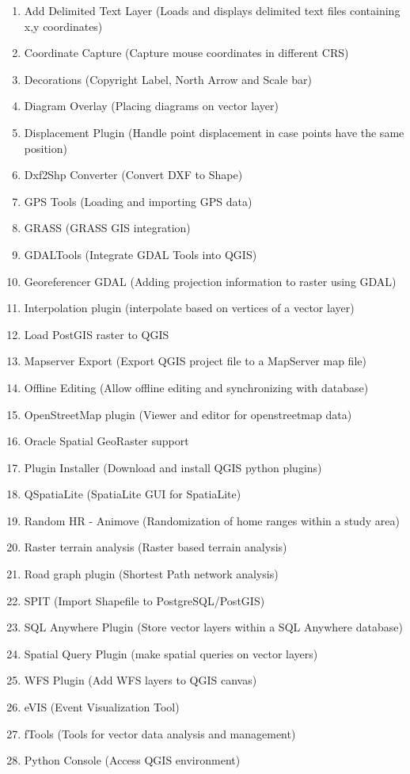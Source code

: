 
\begin{enumerate}
\item Add Delimited Text Layer (Loads and displays delimited text files
containing x,y coordinates)
\item Coordinate Capture (Capture mouse coordinates in different CRS)
\item Decorations (Copyright Label, North Arrow and Scale bar)
\item Diagram Overlay (Placing diagrams on vector layer)
\item Displacement Plugin (Handle point displacement in case points have the same position)
\item Dxf2Shp Converter (Convert DXF to Shape)
\item GPS Tools (Loading and importing GPS data)
\item GRASS (GRASS GIS integration)
\item GDALTools (Integrate GDAL Tools into QGIS)
\item Georeferencer GDAL (Adding projection information to raster using GDAL)
\item Interpolation plugin (interpolate based on vertices of a vector layer)
\item Load PostGIS raster to QGIS 
\item Mapserver Export (Export QGIS project file to a MapServer map file)
\item Offline Editing (Allow offline editing and synchronizing with database)
\item OpenStreetMap plugin (Viewer and editor for openstreetmap data)
\item Oracle Spatial GeoRaster support
\item Plugin Installer (Download and install QGIS python plugins)
\item QSpatiaLite (SpatiaLite GUI for SpatiaLite)
\item Random HR - Animove (Randomization of home ranges within a study area)
\item Raster terrain analysis (Raster based terrain analysis)
\item Road graph plugin (Shortest Path network analysis)
\item SPIT (Import Shapefile to PostgreSQL/PostGIS)
\item SQL Anywhere Plugin (Store vector layers within a SQL Anywhere database)
\item Spatial Query Plugin (make spatial queries on vector layers)
\item WFS Plugin (Add WFS layers to QGIS canvas)
\item eVIS (Event Visualization Tool)
\item fTools (Tools for vector data analysis and management)
\item Python Console (Access QGIS environment)
\end{enumerate}

